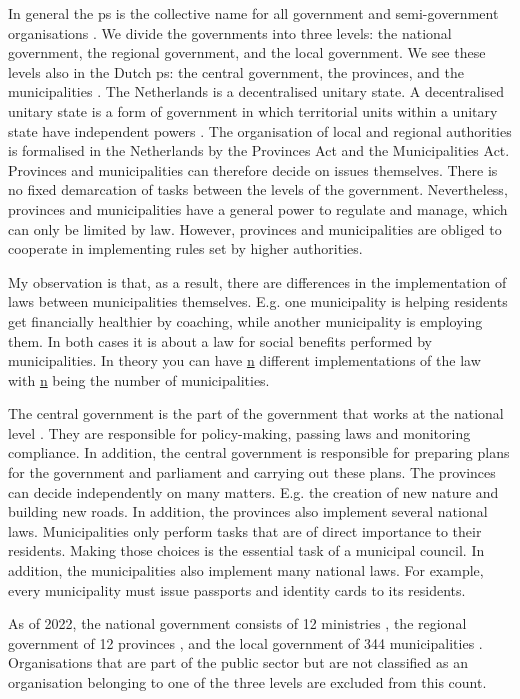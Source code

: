 In general the \gls{ps} is the collective name for all government and semi-government organisations \parencite[p.~261]{Pathirane1982}. We divide the governments into three levels: the national government, the regional government, and the local government. We see these levels also in the Dutch \gls{ps}: the central government, the provinces, and the municipalities \parencite[p.~10]{Libert2016}. The Netherlands is a decentralised unitary state. A decentralised unitary state is a form of government in which territorial units within a unitary state have independent powers \parencite[p.~8]{Engels2013}. The organisation of local and regional authorities is formalised in the Netherlands by the Provinces Act and the Municipalities Act. Provinces and municipalities can therefore decide on issues themselves. There is no fixed demarcation of tasks between the levels of the government. Nevertheless, provinces and municipalities have a general power to regulate and manage, which can only be limited by law. However, provinces and municipalities are obliged to cooperate in implementing rules set by higher authorities.

My observation is that, as a result, there are differences in the implementation of laws between municipalities themselves. E.g. one municipality is helping residents get financially healthier by coaching, while another municipality is employing them. In both cases it is about a law for social benefits performed by municipalities. In theory you can have \underline{n} different implementations of the law with \underline{n} being the number of municipalities.

The central government is the part of the government that works at the national level \parencite{Rijksoverheid2019}. They are responsible for policy-making, passing laws and monitoring compliance. In addition, the central government is responsible for preparing plans for the government and parliament and carrying out these plans.  The provinces can decide independently on many matters. E.g. the creation of new nature and building new roads. In addition, the provinces also implement several national laws. Municipalities only perform tasks that are of direct importance to their residents. Making those choices is the essential task of a municipal council. In addition, the municipalities also implement many national laws. For example, every municipality must issue passports and identity cards to its residents. 

As of 2022, the national government consists of 12 ministries \parencite{Linthorst2021}, the regional government of 12 provinces \parencite{CBS2022prov}, and the local government of 344 municipalities \parencite{CBS2022prov}. Organisations that are part of the public sector but are not classified as an organisation belonging to one of the three levels are excluded from this count. 

